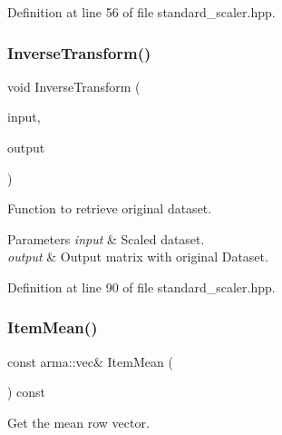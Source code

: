 Definition at line 56 of file standard\+\_\+scaler.\+hpp.

\mbox{\label{classmlpack_1_1data_1_1StandardScaler_afb0e67c6fbf5a527f63469bbbf07066c}} 
\subsubsection{Inverse\+Transform()}
{\footnotesize\ttfamily void Inverse\+Transform (\begin{DoxyParamCaption}\item[{const Mat\+Type \&}]{input,  }\item[{Mat\+Type \&}]{output }\end{DoxyParamCaption})\hspace{0.3cm}{\ttfamily [inline]}}



Function to retrieve original dataset. 


\begin{DoxyParams}{Parameters}
{\em input} & Scaled dataset. \\
\hline
{\em output} & Output matrix with original Dataset. \\
\hline
\end{DoxyParams}


Definition at line 90 of file standard\+\_\+scaler.\+hpp.

\mbox{\label{classmlpack_1_1data_1_1StandardScaler_a95996a797e721bc9acc0c9a5d697fdcf}} 
\subsubsection{Item\+Mean()}
{\footnotesize\ttfamily const arma\+::vec\& Item\+Mean (\begin{DoxyParamCaption}{ }\end{DoxyParamCaption}) const\hspace{0.3cm}{\ttfamily [inline]}}



Get the mean row vector. 



